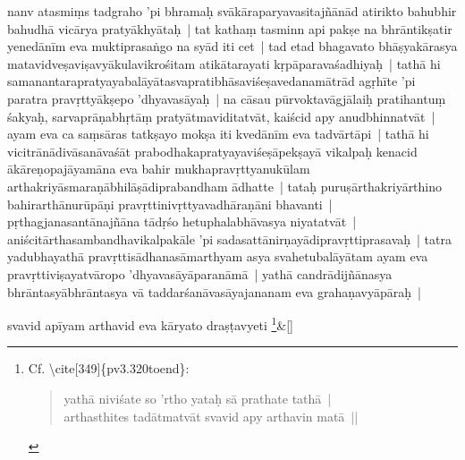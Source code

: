 \documentclass[article,12pt,a4paper]{memoir}
\newcommand{\persName}[1]{#1}
\begin{document}
	  \pstart nanv atasmiṃs tadgraho 'pi bhramaḥ svā\label{capv-np-10a-end}\label{capv-np-10b-start}kāraparyavasitajñānād atirikto bahubhir bahudhā vicārya pratyākhyātaḥ | tat kathaṃ tasminn api pakṣe na bhrāntikṣatir yenedānīm eva muktiprasaṅgo na syād iti cet | tad etad bhagavato \persName{bhāṣyakārasya} matavidveṣaviṣavyākulavikrośitam atikātarayati kṛpāparavaśadhiyaḥ | tathā hi samanantarapratyayabalāyātasvapratibhāsaviśeṣavedanamātrād agṛhīte 'pi paratra pravṛttyākṣepo 'dhyavasāyaḥ | na cāsau pūrvoktavāgjālaiḥ pratihantuṃ śakyaḥ, sarvaprāṇabhṛtāṃ pratyātmaviditatvāt, kaiścid apy anudbhinnatvāt | ayam eva ca saṃsāras tatkṣayo mokṣa iti kvedānīm eva tadvārtāpi | tathā hi vicitrānādivāsanāvaśāt prabodhakapratyayaviśeṣāpekṣayā vikalpaḥ kenacid ākāreṇopajāyamāna eva bahir mukhapravṛttyanukūlam arthakriyāsmaraṇābhilāṣādiprabandham ādhatte | tataḥ puruṣārthakriyārthino bahirarthānurūpāṇi pravṛttinivṛttyavadhāraṇāni bhavanti | pṛthagjanasantānajñāna tādṛśo hetuphalabhāvasya niyatatvāt | aniścitārthasambandhavikalpakāle 'pi sada\label{capv-np-10b-end}sattānirṇayādipravṛttiprasavaḥ | tatra yadubhayathā pravṛttisādhanasāmarthyam asya svahetubalāyātam ayam eva pravṛttiviṣayatvāropo 'dhyavasāyāparanāmā | yathā candrādijñānasya bhrāntasyābhrāntasya vā taddarśanāvasāyajananam eva grahaṇavyāpāraḥ |
	\pend
      
	    
	    \stanza[\smallbreak]
	svavid apīyam arthavid eva kāryato draṣṭavyeti \footnote{Cf. \textbackslash cite[349]\{pv3.320toend\}: 
	    \begin{verse}
	yathā niviśate so 'rtho yataḥ sā prathate tathā |\\
	    arthasthites tadātmatvāt svavid apy arthavin matā ||\\
	    
	    \end{verse}
	  }\&[\smallbreak]


	
\end{document}
